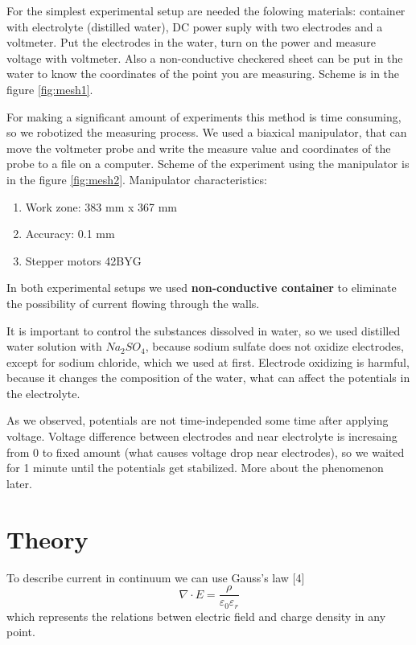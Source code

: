 \documentclass{article}
\begin{document}
For the simplest experimental setup are needed the folowing materials: container with electrolyte (distilled water), DC power suply with two electrodes and a voltmeter. Put the electrodes in the water, turn on the power and measure voltage with voltmeter. Also a non-conductive checkered sheet can be put in the water to know the coordinates of the point you are measuring. Scheme is in the figure \ref{fig:mesh1}.  \par

For making a significant amount of experiments this method is time consuming, so we robotized the measuring process. We used a biaxical manipulator, that can move the voltmeter probe and write the measure value and coordinates of the probe to a file on a computer. Scheme of the experiment using the manipulator is in the figure \ref{fig:mesh2}. Manipulator characteristics:
\begin{enumerate}
\item Work zone: 383 mm x 367 mm
\item Accuracy: 0.1 mm
\item Stepper motors 42BYG
\end{enumerate}

In both experimental setups we used \textbf{non-conductive container} to eliminate the possibility of current flowing through the walls.\par

It is important to control the substances dissolved in water, so we used distilled water solution with $Na_2SO_4$, because sodium sulfate does not oxidize electrodes, except for sodium chloride, which we used at first. Electrode oxidizing is harmful, because it changes the composition of the water, what can affect the potentials in the electrolyte.\par

As we observed, potentials are not time-independed some time after applying voltage. Voltage difference between electrodes and near electrolyte is incresaing from 0 to fixed amount (what causes voltage drop near electrodes), so we waited for 1 minute until the potentials get stabilized. More about the phenomenon later. \par


\section{Theory}

To describe current in continuum we can use Gauss's law [4] $$\nabla\cdot E = \frac{\rho}{\varepsilon_0 \varepsilon_r}$$ which represents the relations betwen electric field and charge density in any point.\par
\end{document}
